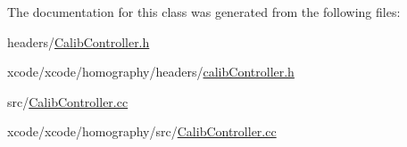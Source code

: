 The documentation for this class was generated from the following files\-:\begin{DoxyCompactItemize}
\item 
headers/\hyperlink{headers_2_calib_controller_8h}{Calib\-Controller.\-h}\item 
xcode/xcode/homography/headers/\hyperlink{xcode_2xcode_2homography_2headers_2_calib_controller_8h}{calib\-Controller.\-h}\item 
src/\hyperlink{src_2_calib_controller_8cc}{Calib\-Controller.\-cc}\item 
xcode/xcode/homography/src/\hyperlink{xcode_2xcode_2homography_2src_2_calib_controller_8cc}{Calib\-Controller.\-cc}\end{DoxyCompactItemize}
